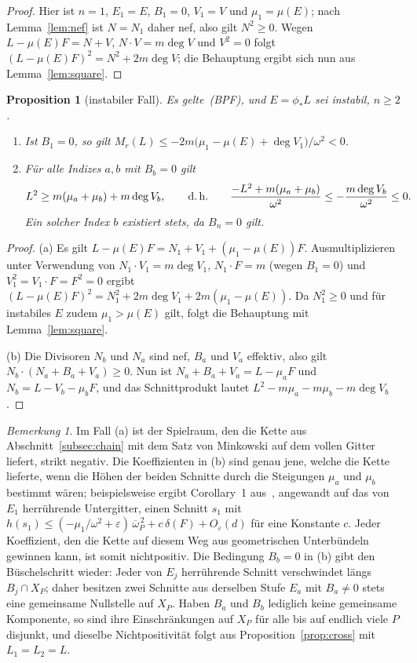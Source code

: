 \documentclass[11pt]{article}
\newtheorem{proposition}[theorem]{Proposition}
\theoremstyle{definition}
\theoremstyle{remark}
\newtheorem{remark}[theorem]{Bemerkung}
\newcommand{\ob}{\overline{\omega}}
\newcommand{\bpf}{\textup{(BPF)}}
\begin{document}
\begin{proof}
Hier ist $n=1$, $E_1=E$, $B_1=0$, $V_1=V$ und $\mu_1=\mu(E)$; nach
Lemma~\ref{lem:nef} ist $N=N_1$ daher nef, also gilt $N^2\ge 0$. Wegen
$L-\mu(E)F=N+V$, $N\cdot V=m\deg V$ und $V^2=0$ folgt
$(L-\mu(E)F)^2=N^2+2m\deg V$; die Behauptung ergibt sich nun aus
Lemma~\ref{lem:square}.
\end{proof}

\begin{proposition}[instabiler Fall]\label{prop:unstable}
Es gelte~\bpf, und $E=\phi_*L$ sei instabil, $n\ge 2$.
\begin{enumerate}[label=(\alph*)]
\item Ist $B_1=0$, so gilt
$M_r(L)\le-2m\bigl(\mu_1-\mu(E)+\deg V_1\bigr)/\omega^2<0$.
\item Für alle Indizes $a,b$ mit $B_b=0$ gilt
\[
L^2\ge m(\mu_a+\mu_b)+m\deg V_b ,\qquad\text{d.\,h.}\qquad
\frac{-L^2+m(\mu_a+\mu_b)}{\omega^2}\le-\frac{m\deg V_b}{\omega^2}\le 0 .
\]
Ein solcher Index $b$ existiert stets, da $B_n=0$ gilt.
\end{enumerate}
\end{proposition}

\begin{proof}
(a) Es gilt $L-\mu(E)F=N_1+V_1+(\mu_1-\mu(E))F$. Ausmultiplizieren unter
Verwendung von $N_1\cdot V_1=m\deg V_1$, $N_1\cdot F=m$ (wegen $B_1=0$) und
$V_1^2=V_1\cdot F=F^2=0$ ergibt
$(L-\mu(E)F)^2=N_1^2+2m\deg V_1+2m(\mu_1-\mu(E))$. Da $N_1^2\ge 0$ und für
instabiles $E$ zudem $\mu_1>\mu(E)$ gilt, folgt die Behauptung mit
Lemma~\ref{lem:square}.

(b) Die Divisoren $N_b$ und $N_a$ sind nef, $B_a$ und $V_a$ effektiv, also gilt
$N_b\cdot(N_a+B_a+V_a)\ge 0$. Nun ist $N_a+B_a+V_a=L-\mu_aF$ und
$N_b=L-V_b-\mu_bF$, und das Schnittprodukt lautet $L^2-m\mu_a-m\mu_b-m\deg V_b$.
\end{proof}

\begin{remark}\label{rem:unstable}
Im Fall (a) ist der Spielraum, den die Kette aus Abschnitt~\ref{subsec:chain} mit
dem Satz von Minkowski auf dem vollen Gitter liefert, strikt negativ. Die
Koeffizienten in (b) sind genau jene, welche die Kette lieferte, wenn die Höhen
der beiden Schnitte durch die Steigungen $\mu_a$ und $\mu_b$ bestimmt wären;
beispielsweise ergibt Corollary~1 aus~\cite{So26}, angewandt auf das von $E_1$
herrührende Untergitter, einen Schnitt $s_1$ mit
$h(s_1)\le(-\mu_1/\omega^2+\varepsilon)\,\ob_P^{\,2}+c\,\delta(F)+O_\varepsilon(d)$
für eine Konstante $c$. Jeder Koeffizient, den die Kette auf diesem Weg aus
geometrischen Unterbündeln gewinnen kann, ist somit nichtpositiv. Die Bedingung
$B_b=0$ in (b) gibt den Büschelschritt wieder: Jeder von $E_j$ herrührende Schnitt
verschwindet längs $B_j\cap X_P$; daher besitzen zwei Schnitte aus derselben Stufe
$E_a$ mit $B_a\ne 0$ stets eine gemeinsame Nullstelle auf $X_P$. Haben $B_a$ und
$B_b$ lediglich keine gemeinsame Komponente, so sind ihre Einschränkungen auf
$X_P$ für alle bis auf endlich viele $P$ disjunkt, und dieselbe Nichtpositivität
folgt aus Proposition~\ref{prop:cross} mit $L_1=L_2=L$.
\end{remark}
\end{document}
